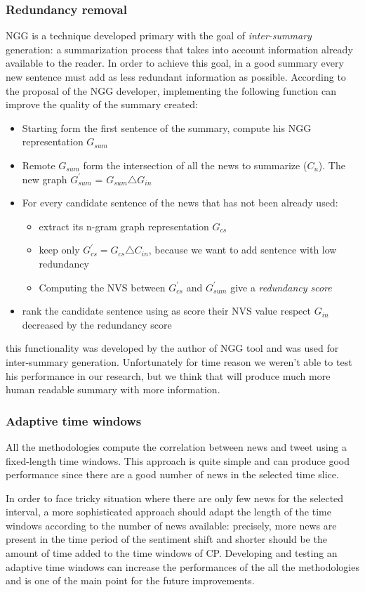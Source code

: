 \subsubsection*{Redundancy removal}
NGG is a technique developed primary with the goal of \emph{inter-summary} generation: a summarization process that takes into account information already available to the reader. In order to achieve this goal, in a good summary every new sentence must add as less redundant information as possible.
According to the proposal of the NGG developer, implementing the following function can improve the quality of the summary created:
\begin{itemize}
	\item Starting form the first sentence of the summary, compute his NGG representation $G_{sum}$
	\item Remote $G_{sum}$ form the intersection of all the news to summarize ($C_{u}$). The new graph $G_{sum}^{\prime}$ = $G_{sum} \triangle G_{in}$
	\item For every candidate sentence of the news that has not been already used:
	\begin{itemize}
		\item extract its n-gram graph representation $G_{cs}$
		\item keep only $G_{cs}^{\prime} = G_{cs} \triangle C_{in}$, because we want to add sentence with low redundancy
		\item Computing the NVS between $G_{cs}^{\prime}$ and $G_{sum}^{\prime}$ give a \emph{redundancy score}
	\end{itemize}
	\item rank the candidate sentence using as score their NVS value respect $G_{in}$ decreased by the redundancy score
\end{itemize}
this functionality was developed by the author of NGG tool and was used for inter-summary generation. Unfortunately for time reason we weren't able to test his performance in our research, but we think that will produce much more human readable summary with more information.

\subsubsection*{Adaptive time windows}
All the methodologies compute the correlation between news and tweet using a fixed-length time windows. This approach is quite simple and can produce good performance since there are a good number of news in the selected time slice. 

In order to face tricky situation where there are only few news for the selected interval, a more sophisticated approach should adapt the length of the time windows according to the number of news available:
precisely, more news are present in the time period of the sentiment shift and shorter should be the amount of time added to the time windows of CP.
Developing and testing an adaptive time windows can increase the performances of the all the methodologies and is one of the main point for the future improvements.


